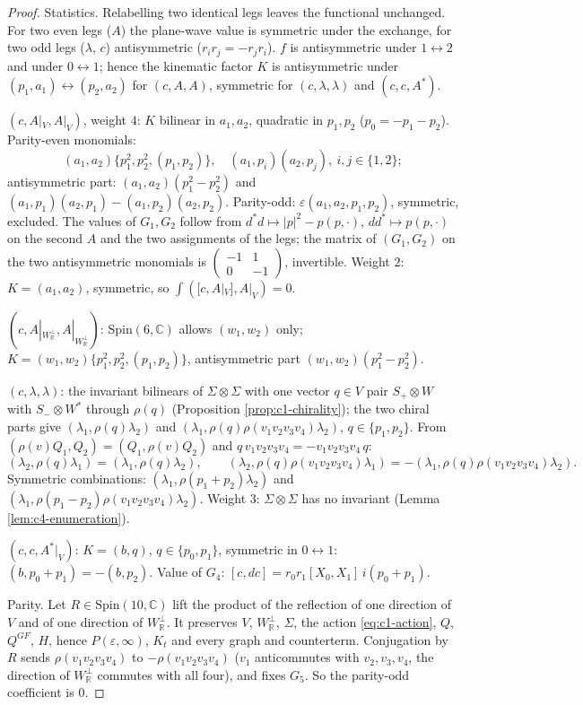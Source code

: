 \begin{proof}
Statistics. Relabelling two identical legs leaves the functional unchanged. For two even legs ($A$) the plane-wave value is symmetric under the exchange, for two odd legs ($\lambda$, $c$) antisymmetric ($r_ir_j=-r_jr_i$). $f$ is antisymmetric under $1\leftrightarrow2$ and under $0\leftrightarrow1$; hence the kinematic factor $K$ is antisymmetric under $(p_1,a_1)\leftrightarrow(p_2,a_2)$ for $(c,A,A)$, symmetric for $(c,\lambda,\lambda)$ and $(c,c,A^*)$.

$(c,A|_V,A|_V)$, weight $4$: $K$ bilinear in $a_1,a_2$, quadratic in $p_1,p_2$ ($p_0=-p_1-p_2$). Parity-even monomials:
\[
(a_1,a_2)\{p_1^2,p_2^2,(p_1,p_2)\},\quad (a_1,p_i)(a_2,p_j),\ i,j\in\{1,2\};
\]
antisymmetric part: $(a_1,a_2)(p_1^2-p_2^2)$ and $(a_1,p_1)(a_2,p_1)-(a_1,p_2)(a_2,p_2)$. Parity-odd: $\varepsilon(a_1,a_2,p_1,p_2)$, symmetric, excluded. The values of $G_1,G_2$ follow from $d^*d\mapsto|p|^2-p(p,\cdot)$, $dd^*\mapsto p(p,\cdot)$ on the second $A$ and the two assignments of the legs; the matrix of $(G_1,G_2)$ on the two antisymmetric monomials is $\begin{pmatrix}-1&1\\0&-1\end{pmatrix}$, invertible. Weight $2$: $K=(a_1,a_2)$, symmetric, so $\int([c,A|_V],A|_V)=0$.

$(c,A|_{W_{\mathbb R}^\perp},A|_{W_{\mathbb R}^\perp})$: $\mathrm{Spin}(6,\mathbb C)$ allows $(w_1,w_2)$ only; $K=(w_1,w_2)\{p_1^2,p_2^2,(p_1,p_2)\}$, antisymmetric part $(w_1,w_2)(p_1^2-p_2^2)$.

$(c,\lambda,\lambda)$: the invariant bilinears of $\Sigma\otimes\Sigma$ with one vector $q\in V$ pair $S_+\otimes W$ with $S_-\otimes W^*$ through $\rho(q)$ (Proposition \ref{prop:c1-chirality}); the two chiral parts give $(\lambda_1,\rho(q)\lambda_2)$ and $(\lambda_1,\rho(q)\rho(v_1v_2v_3v_4)\lambda_2)$, $q\in\{p_1,p_2\}$. From $(\rho(v)Q_1,Q_2)=(Q_1,\rho(v)Q_2)$ and $q\,v_1v_2v_3v_4=-v_1v_2v_3v_4\,q$:
\[
(\lambda_2,\rho(q)\lambda_1)=(\lambda_1,\rho(q)\lambda_2),\qquad (\lambda_2,\rho(q)\rho(v_1v_2v_3v_4)\lambda_1)=-(\lambda_1,\rho(q)\rho(v_1v_2v_3v_4)\lambda_2).
\]
Symmetric combinations: $(\lambda_1,\rho(p_1+p_2)\lambda_2)$ and $(\lambda_1,\rho(p_1-p_2)\rho(v_1v_2v_3v_4)\lambda_2)$. Weight $3$: $\Sigma\otimes\Sigma$ has no invariant (Lemma \ref{lem:c4-enumeration}).

$(c,c,A^*|_V)$: $K=(b,q)$, $q\in\{p_0,p_1\}$, symmetric in $0\leftrightarrow1$: $(b,p_0+p_1)=-(b,p_2)$. Value of $G_4$: $[c,dc]=r_0r_1[X_0,X_1]\,i(p_0+p_1)$.

Parity. Let $R\in\mathrm{Spin}(10,\mathbb C)$ lift the product of the reflection of one direction of $V$ and of one direction of $W_{\mathbb R}^\perp$. It preserves $V$, $W_{\mathbb R}^\perp$, $\Sigma$, the action \eqref{eq:c1-action}, $Q$, $Q^{GF}$, $H$, hence $P(\varepsilon,\infty)$, $K_t$ and every graph and counterterm. Conjugation by $R$ sends $\rho(v_1v_2v_3v_4)$ to $-\rho(v_1v_2v_3v_4)$ ($v_1$ anticommutes with $v_2,v_3,v_4$, the direction of $W_{\mathbb R}^\perp$ commutes with all four), and fixes $G_5$. So the parity-odd coefficient is $0$.
\end{proof}

